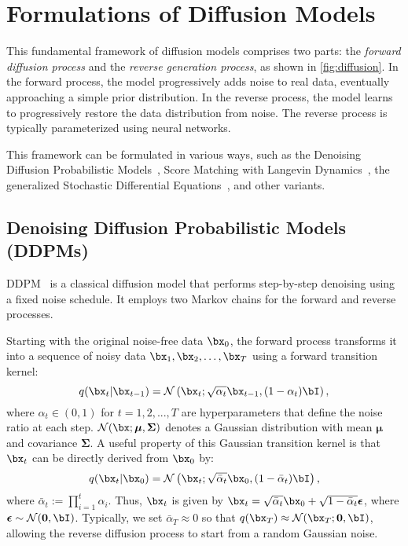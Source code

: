 \section{Formulations of Diffusion Models}\label{sec:diffusion}

This fundamental framework of diffusion models comprises two parts: the \textit{forward diffusion process} and the \textit{reverse generation process}, as shown in \cref{fig:diffusion}. In the forward process, the model progressively adds noise to real data, eventually approaching a simple prior distribution.
In the reverse process, the model learns to progressively restore the data distribution from noise.
The reverse process is typically parameterized using neural networks.

This framework can be formulated in various ways, such as the Denoising Diffusion Probabilistic Models~\citep{DDPM}, Score Matching with Langevin Dynamics~\citep{SMLD}, the generalized Stochastic Differential Equations~\citep{SDE}, and other variants.


\subsection{Denoising Diffusion Probabilistic Models (DDPMs)}

DDPM~\citep{Diffusion,DDPM} is a classical diffusion model that performs step-by-step denoising using a fixed noise schedule. It employs two Markov chains for the forward and reverse processes. 

Starting with the original noise-free data $\bx_0$, the forward process transforms it into a sequence of noisy data $\bx_1, \bx_2, \ldots, \bx_T$ using a forward transition kernel:
\begin{equation}
q(\bx_t|\bx_{t-1}) = \mathcal{N}\left(\bx_t; \sqrt{\alpha_t}\bx_{t-1}, (1-\alpha_t)\bI\right),
\end{equation}
where $\alpha_t \in (0, 1)$ for $t = 1, 2, ..., T$ are hyperparameters that define the noise ratio at each step. $\mathcal{N}(\bx; \boldsymbol{\mu}, \mathbf{\Sigma})$ denotes a Gaussian distribution with mean $\boldsymbol{\mu}$ and covariance $\mathbf{\Sigma}$. A useful property of this Gaussian transition kernel is that $\bx_t$ can be directly derived from $\bx_0$ by:
\begin{equation}
q(\bx_t|\bx_0) = \mathcal{N}\left(\bx_t; \sqrt{\bar{\alpha}_t}\bx_0, (1-\bar{\alpha}_t)\bI\right),
\label{eq:forward-property}
\end{equation}
where $\bar{\alpha}_t := \prod_{i=1}^t \alpha_i$. Thus, $\bx_t$ is given by $\bx_t = \sqrt{\bar{\alpha}_t}\bx_0 + \sqrt{1-\bar{\alpha}_t}\boldsymbol{\epsilon}$, where $\boldsymbol{\epsilon} \sim \mathcal{N}(\mathbf{0}, \bI)$. Typically, we set $\bar{\alpha}_T \approx 0$ so that $q(\bx_T) \approx \mathcal{N}(\bx_T; \mathbf{0}, \bI)$, allowing the reverse diffusion process to start from a random Gaussian noise.

